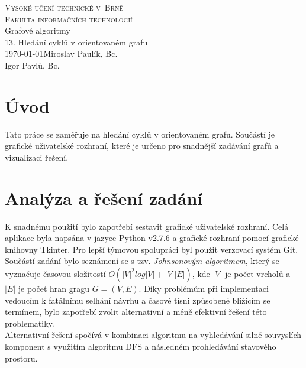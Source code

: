 \documentclass[11pt]{article}
\begin{document}
\begin{titlepage}
\begin{center}
\textsc{\Huge Vysoké učení technické v~Brně\\ 
\huge Fakulta informačních technologií}\\
\LARGE Grafové algoritmy\\
\Huge 13. Hledání cyklů v orientovaném grafu\\
\Large \today \hfill Miroslav Paulík, Bc.\\ \hfill Igor Pavlů, Bc.
\end{center}
\end{titlepage}
\tableofcontents
\newpage
\section{Úvod}
Tato práce se zaměřuje na hledání cyklů v orientovaném grafu. Součástí je grafické uživatelské rozhraní, které je určeno pro snadnější zadávání grafů a vizualizaci řešení. \\
	
\section{Analýza a řešení zadání}
K snadnému použití bylo zapotřebí sestavit grafické uživatelské rozhraní. Celá aplikace byla napsána v jazyce Python v2.7.6\cite{python} a grafické rozhraní pomocí grafické knihovny Tkinter\cite{tkinter}. Pro lepší týmovou spolupráci byl použit verzovací systém Git.\\ 
Součástí zadání bylo seznámení se s tzv. \textit{Johnsonovým algoritmem}\cite{jonshon}, který se vyznačuje časovou složitostí $O(|V|^2log|V| + |V||E|)$, kde $|V|$ je počet vrcholů a $|E|$ je počet hran gragu $G = (V, E)$. Díky problémům při implementaci vedoucím k fatálnímu selhání návrhu a časové tísni způsobené blížícím se termínem, bylo zapotřebí zvolit alternativní a méně efektivní řešení této problematiky.\\
Alternativní řešení spočívá v kombinaci algoritmu na vyhledávání silně souvyslích komponent\cite{gal} s využitím algoritmu DFS a následném prohledávání stavového prostoru. \\
\end{document}
